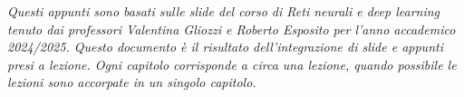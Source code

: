 \documentclass[12pt,a4paper,openright,oneside]{book}	%
\let\origdoublepage\cleardoublepage
\newcommand{\clearemptydoublepage}{%
  \clearpage
  {\pagestyle{empty}\origdoublepage}%
}
\begin{document}
\frontmatter

%
\textit{Questi appunti sono basati sulle slide del corso di Reti neurali e deep learning tenuto dai professori Valentina Gliozzi e Roberto Esposito per l'anno accademico 2024/2025. Questo documento è il risultato dell'integrazione di slide e appunti presi a lezione. Ogni capitolo corrisponde a circa una lezione, quando possibile le lezioni sono accorpate in un singolo capitolo.}
\tableofcontents


\mainmatter

\clearemptydoublepage
%
%
%
%
%
%
%
%
%
%

\clearemptydoublepage

\backmatter
\clearemptydoublepage
%
%
\clearemptydoublepage
\end{document}
